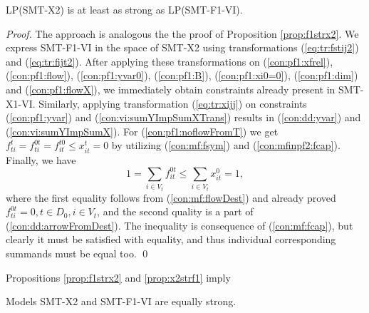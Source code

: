 \begin{prop}
\label{prop:x2strf1}
LP(SMT-X2) is at least as strong as LP(SMT-F1-VI). 
\end{prop}
\begin{proof}
The approach is analogous the the proof of Proposition \ref{prop:f1strx2}. We express SMT-F1-VI in the space of SMT-X2 using transformations (\ref{eq:tr:fstij2}) and (\ref{eq:tr:fijt2}). After applying these transformations on (\ref{con:pf1:xfrel}), (\ref{con:pf1:flow}), (\ref{con:pf1:yvar0}), (\ref{con:pf1:B}), (\ref{con:pf1:xi0=0}), (\ref{con:pf1:dim}) and (\ref{con:pf1:flowX}), we immediately obtain constraints already present in SMT-X1-VI. Similarly, applying transformation (\ref{eq:tr:xijj}) on constraints (\ref{con:pf1:yvar}) and (\ref{con:vi:sumYImpSumXTrans}) results in (\ref{con:dd:yvar}) and (\ref{con:vi:sumYImpSumX}). For (\ref{con:pf1:noflowFromT}) we get $f^t_{ti}=f^{0t}_{ti}=f^{t0}_{it}\leq x^t_{it}=0$ by utilizing (\ref{con:mf:fsym}) and (\ref{con:mfinpf2:fcap}). Finally, we have $$1=\sum_{i\in V_t}f^{0t}_{it}\leq \sum_{i\in V_t}x^0_{it}=1,$$ where the first equality follows from (\ref{con:mf:flowDest}) and already proved $f^{0t}_{ti}=0, t\in D_0,i\in V_t$, and the second quality is a part of (\ref{con:dd:arrowFromDest}). The inequality is consequence of (\ref{con:mf:fcap}), but clearly it must be satisfied with equality, and thus individual corresponding summands must be equal too. 
\qed
\end{proof}
Propositions \ref{prop:f1strx2} and \ref{prop:x2strf1} imply
\begin{corollary}
Models SMT-X2 and SMT-F1-VI are equally strong.
\end{corollary}

